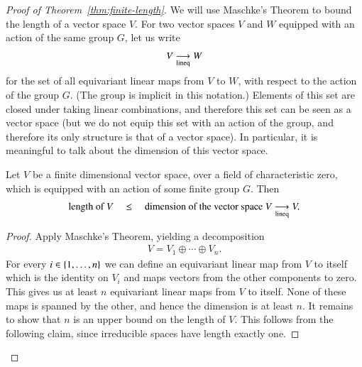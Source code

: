 \begin{proof}[Proof of Theorem~\ref{thm:finite-length}]
    We will use Maschke's Theorem to bound the length of a vector  space $V$. 
    For two vector spaces $V$ and $W$ equipped with an action of the same group $G$, let us write 
    \begin{align*}
    V \underset{\text{lineq}}{\longrightarrow} W
    \end{align*}
    for the set of all equivariant linear maps from $V$ to $W$, with respect to the action of the group $G$. (The group is implicit in this notation.) Elements of this set are closed under taking linear combinations, and therefore this set can be seen as a vector space (but we do not equip this set  with an action of the group, and therefore its only structure is that of a vector space). In particular, it is meaningful to talk about the dimension of this vector space. 
    \begin{lemma}\label{lem:dim-bounds-length}
        Let $V$ be a finite dimensional vector space, over a field of characteristic zero, which is equipped with an action of some finite group $G$. Then 
        \begin{align*}
        \text{length of $V$} \quad \leq  \quad \text{dimension of the vector space }  V \underset{\text{lineq}}{\longrightarrow} V.
        \end{align*}
    \end{lemma}
    \begin{proof}
        Apply Maschke's Theorem, yielding a decomposition 
        \begin{align}\label{eq:maschke-decomposition}
        V = V_1 \oplus \cdots \oplus V_n.
        \end{align}
        For every $i \in \{1,\ldots,n\}$ we can define an equivariant linear map from $V$ to itself which is the identity on $V_i$ and maps vectors from the other components to zero.  This gives us  at least $n$ equivariant linear maps from $V$ to itself. None of these maps is spanned by the other, and hence the dimension is at least $n$. It remains to show that $n$ is an upper bound on the length of $V$. This follows from the following claim,  since irreducible spaces have length exactly one.


\end{proof}
\end{proof}
